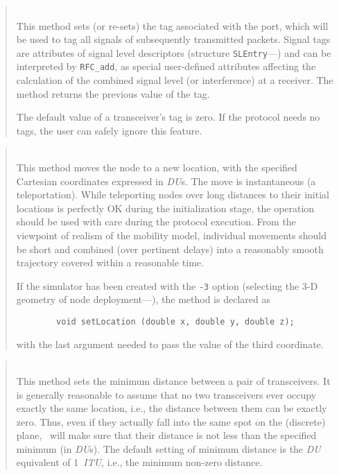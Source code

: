 \begin{quote}
\noindent{} \hspace{0in}\vspace{0.05in}\\
\noindent
This method sets (or re-sets) the tag associated with the port, which will be
used to tag all signals of subsequently transmitted packets.
Signal tags are attributes of signal level descriptors (structure
{\tt SLEntry}---)
and can be interpreted by {\tt RFC\_add}, as special user-defined
attributes affecting the calculation of the combined signal level
(or interference) at a receiver.
The method returns the previous value of the tag.

\noindent
The default value of a transceiver's tag is zero.
If the protocol needs no tags, the user can safely ignore this feature.
\end{quote}

\begin{quote}
\noindent{} \hspace{0in}\vspace{0.05in}\\
\noindent
This method moves the node to a new location, with the specified
Cartesian coordinates expressed in {\em DU\/}s.
The move is instantaneous (a teleportation).
While teleporting nodes over long distances to their initial locations
is perfectly OK during the initialization stage, the operation should be used
with care during the protocol execution.
From the viewpoint of realism of the mobility model, individual movements
should be short and combined (over pertinent delays) into a reasonably smooth
trajectory covered within a reasonable time.

\noindent
If the simulator has been created with the {\tt -3} option (selecting the
3-D geometry of node deployment---), the method is
declared as
\begin{verbatim}
        void setLocation (double x, double y, double z);
\end{verbatim}
\noindent
with the last argument needed to pass the value of the third coordinate.
\end{quote}

\begin{quote}
\noindent{} \hspace{0in}\vspace{0.05in}\\
\noindent
This method sets the minimum distance between a pair of transceivers.
It is generally reasonable to assume that no two transceivers ever
occupy exactly the same location, i.e., the distance between them can
be exactly zero.
Thus, even if they actually fall into the same spot on the (discrete)
plane, \smurph\ will make sure that their distance is not less than the
specified minimum (in {\em DU\/}s).
The default setting of minimum distance is the {\em DU\/} equivalent of
1~{\em ITU}, i.e., the minimum non-zero distance.
\end{quote}

